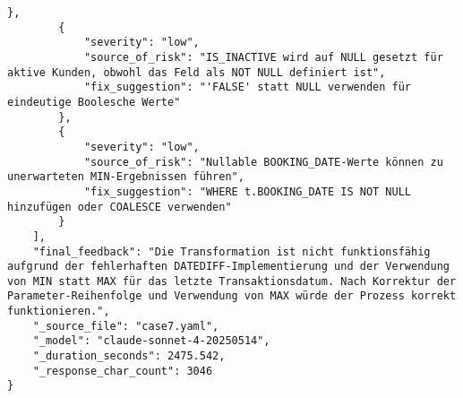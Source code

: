 \begin{lstlisting}[caption={Ausgabe: Claude Sonnet 4 Anwendungsfall 7 Robustheitsdurchlauf},label={claude_case7_prompt3}]
        },
        {
            "severity": "low",
            "source_of_risk": "IS_INACTIVE wird auf NULL gesetzt für aktive Kunden, obwohl das Feld als NOT NULL definiert ist",
            "fix_suggestion": "'FALSE' statt NULL verwenden für eindeutige Boolesche Werte"
        },
        {
            "severity": "low",
            "source_of_risk": "Nullable BOOKING_DATE-Werte können zu unerwarteten MIN-Ergebnissen führen",
            "fix_suggestion": "WHERE t.BOOKING_DATE IS NOT NULL hinzufügen oder COALESCE verwenden"
        }
    ],
    "final_feedback": "Die Transformation ist nicht funktionsfähig aufgrund der fehlerhaften DATEDIFF-Implementierung und der Verwendung von MIN statt MAX für das letzte Transaktionsdatum. Nach Korrektur der Parameter-Reihenfolge und Verwendung von MAX würde der Prozess korrekt funktionieren.",
    "_source_file": "case7.yaml",
    "_model": "claude-sonnet-4-20250514",
    "_duration_seconds": 2475.542,
    "_response_char_count": 3046
}
\end{lstlisting}

